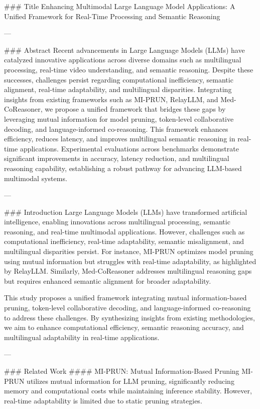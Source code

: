 ### Title
Enhancing Multimodal Large Language Model Applications: A Unified Framework for Real-Time Processing and Semantic Reasoning

---

### Abstract
Recent advancements in Large Language Models (LLMs) have catalyzed innovative applications across diverse domains such as multilingual processing, real-time video understanding, and semantic reasoning. Despite these successes, challenges persist regarding computational inefficiency, semantic alignment, real-time adaptability, and multilingual disparities. Integrating insights from existing frameworks such as MI-PRUN, RelayLLM, and Med-CoReasoner, we propose a unified framework that bridges these gaps by leveraging mutual information for model pruning, token-level collaborative decoding, and language-informed co-reasoning. This framework enhances efficiency, reduces latency, and improves multilingual semantic reasoning in real-time applications. Experimental evaluations across benchmarks demonstrate significant improvements in accuracy, latency reduction, and multilingual reasoning capability, establishing a robust pathway for advancing LLM-based multimodal systems. 

---

### Introduction
Large Language Models (LLMs) have transformed artificial intelligence, enabling innovations across multilingual processing, semantic reasoning, and real-time multimodal applications. However, challenges such as computational inefficiency, real-time adaptability, semantic misalignment, and multilingual disparities persist. For instance, MI-PRUN optimizes model pruning using mutual information but struggles with real-time adaptability, as highlighted by RelayLLM. Similarly, Med-CoReasoner addresses multilingual reasoning gaps but requires enhanced semantic alignment for broader adaptability.

This study proposes a unified framework integrating mutual information-based pruning, token-level collaborative decoding, and language-informed co-reasoning to address these challenges. By synthesizing insights from existing methodologies, we aim to enhance computational efficiency, semantic reasoning accuracy, and multilingual adaptability in real-time applications.

---

### Related Work
#### MI-PRUN: Mutual Information-Based Pruning
MI-PRUN utilizes mutual information for LLM pruning, significantly reducing memory and computational costs while maintaining inference stability. However, real-time adaptability is limited due to static pruning strategies.

